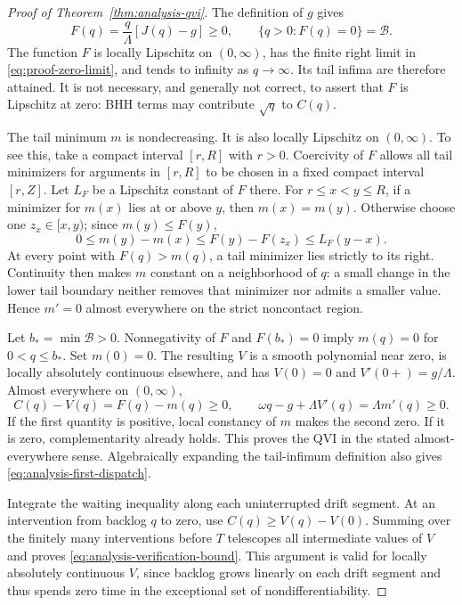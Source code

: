 \begin{proof}[Proof of Theorem~\ref{thm:analysis-qvi}]
The definition of $g$ gives
\[
 F(q)=\frac q\Lambda[J(q)-g]\ge0,
 \qquad \{q>0:F(q)=0\}=\mathcal B.
\]
The function $F$ is locally Lipschitz on $(0,\infty)$, has the finite
right limit in \eqref{eq:proof-zero-limit}, and tends to infinity as
$q\to\infty$. Its tail infima are therefore attained. It is not
necessary, and generally not correct, to assert that $F$ is Lipschitz
at zero: BHH terms may contribute $\sqrt q$ to $C(q)$.

The tail minimum $m$ is nondecreasing. It is also locally Lipschitz on
$(0,\infty)$. To see this, take a compact interval $[r,R]$ with $r>0$.
Coercivity of $F$ allows all tail minimizers for arguments in $[r,R]$
to be chosen in a fixed compact interval $[r,Z]$. Let $L_F$ be a
Lipschitz constant of $F$ there. For $r\le x<y\le R$, if a minimizer
for $m(x)$ lies at or above $y$, then $m(x)=m(y)$. Otherwise choose
one $z_x\in[x,y)$; since $m(y)\le F(y)$,
\[
 0\le m(y)-m(x)\le F(y)-F(z_x)\le L_F(y-x).
\]
At every point with $F(q)>m(q)$, a tail minimizer lies strictly to its
right. Continuity then makes $m$ constant on a neighborhood of $q$:
a small change in the lower tail boundary neither removes that minimizer
nor admits a smaller value. Hence $m'=0$ almost everywhere on the strict
noncontact region.

Let $b_* =\min\mathcal B>0$. Nonnegativity of $F$ and $F(b_*)=0$ imply
$m(q)=0$ for $0<q\le b_*$. Set $m(0)=0$. The resulting $V$ is a smooth
polynomial near zero, is locally absolutely continuous elsewhere, and
has $V(0)=0$ and $V'(0+)=g/\Lambda$. Almost everywhere on $(0,\infty)$,
\[
 C(q)-V(q)=F(q)-m(q)\ge0,
 \qquad
 \omega q-g+\Lambda V'(q)=\Lambda m'(q)\ge0.
\]
If the first quantity is positive, local constancy of $m$ makes the
second zero. If it is zero, complementarity already holds. This proves
the QVI in the stated almost-everywhere sense. Algebraically expanding
the tail-infimum definition also gives
\eqref{eq:analysis-first-dispatch}.

Integrate the waiting inequality along each uninterrupted drift segment.
At an intervention from backlog $q$ to zero, use
$C(q)\ge V(q)-V(0)$. Summing over the finitely many interventions
before $T$ telescopes all intermediate values of $V$ and proves
\eqref{eq:analysis-verification-bound}. This argument is valid for
locally absolutely continuous $V$, since backlog grows linearly on each
drift segment and thus spends zero time in the exceptional set of
nondifferentiability.


\end{proof}
